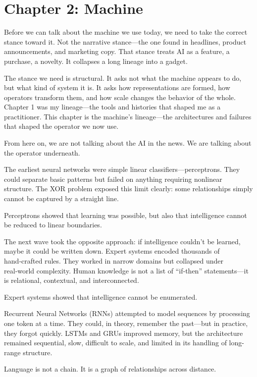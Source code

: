 \hypertarget{chapter-2-machine-1}{%
\section{Chapter 2: Machine}\label{chapter-2-machine-1}}

Before we can talk about the machine we use today, we need to take the
correct stance toward it. Not the narrative stance---the one found in
headlines, product announcements, and marketing copy. That stance treats
AI as a feature, a purchase, a novelty. It collapses a long lineage into
a gadget.

The stance we need is structural. It asks not what the machine appears
to do, but what kind of system it is. It asks how representations are
formed, how operators transform them, and how scale changes the behavior
of the whole. Chapter 1 was my lineage---the tools and histories that
shaped me as a practitioner. This chapter is the machine's lineage---the
architectures and failures that shaped the operator we now use.

From here on, we are not talking about the AI in the news. We are
talking about the operator underneath.

The earliest neural networks were simple linear
classifiers---perceptrons. They could separate basic patterns but failed
on anything requiring nonlinear structure. The XOR problem exposed this
limit clearly: some relationships simply cannot be captured by a
straight line.

Perceptrons showed that learning was possible, but also that
intelligence cannot be reduced to linear boundaries.

The next wave took the opposite approach: if intelligence couldn't be
learned, maybe it could be written down. Expert systems encoded
thousands of hand‑crafted rules. They worked in narrow domains but
collapsed under real‑world complexity. Human knowledge is not a list of
``if‑then'' statements---it is relational, contextual, and
interconnected.

Expert systems showed that intelligence cannot be enumerated.

Recurrent Neural Networks (RNNs) attempted to model sequences by
processing one token at a time. They could, in theory, remember the
past---but in practice, they forgot quickly. LSTMs and GRUs improved
memory, but the architecture remained sequential, slow, difficult to
scale, and limited in its handling of long-range structure.

Language is not a chain. It is a graph of relationships across distance.

